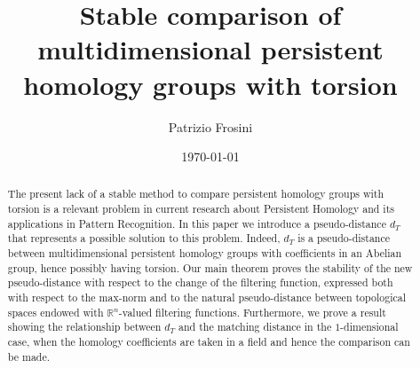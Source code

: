 \documentclass{amsart}
\theoremstyle{definition}
\theoremstyle{remark}
\newcommand{\R}{\mathbb{R}}
\numberwithin{equation}{section}
\begin{document}
\title[Stable comparison of multidimensional persistent homology groups]{Stable comparison of multidimensional persistent homology groups with torsion}

\author[P. Frosini]{Patrizio Frosini}
\address{Patrizio Frosini, ARCES, Universit\`a di Bologna,
via Toffano $2/2$, I-$40135$ Bologna, Italia\newline Dipartimento
di Matematica, Universit\`a di Bologna, P.zza di Porta S. Donato
5, I-$40126$ Bologna, Italia, tel. +39-051-2094478, fax.
+39-051-2094490} 


\subjclass[2000]{}

\date{\today} 




\begin{abstract}
The present lack of a stable method to compare persistent homology groups with torsion is a relevant problem in current research about Persistent Homology and its applications in Pattern Recognition. In this paper we introduce a pseudo-distance $d_T$ that represents a possible solution to this problem. Indeed, $d_T$ is a pseudo-distance between multidimensional persistent homology groups with coefficients in an Abelian group, hence possibly having torsion. Our main theorem proves the stability of the new pseudo-distance with respect to the change of the filtering function, expressed both with respect to the max-norm and to the natural pseudo-distance between topological spaces endowed with $\R^n$-valued filtering functions. Furthermore, we prove a result showing the relationship between $d_T$ and the matching distance in the $1$-dimensional case, when the homology coefficients are taken in a field and hence the comparison can be made.
\end{abstract}

\maketitle
\end{document}
